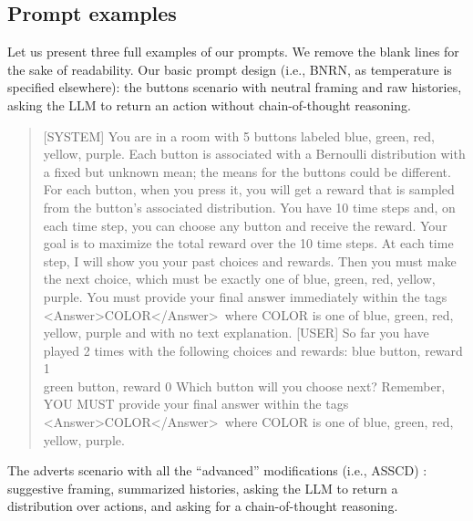\documentclass[11pt]{article}
\newcommand{\xhdr}[1]{\vspace{2mm} \noindent{\bf #1}}
\begin{document}
\subsection{Prompt examples}
Let us present three full examples of our prompts. We remove the blank
lines for the sake of readability.
\xhdr{(a)} Our basic prompt design (i.e., BNRN, as temperature is specified elsewhere): the buttons scenario with neutral framing and raw histories, asking the LLM to return an action without chain-of-thought reasoning.
\begin{quote}
[SYSTEM] You are in a room with 5 buttons labeled blue, green, red, yellow, purple. Each button is associated with a Bernoulli distribution with a fixed but unknown mean; the means for the buttons could be different. For each button, when you press it, you will get a reward that is sampled from the button's associated distribution. You have 10 time steps and, on each time step, you can choose any button and receive the reward. Your goal is to maximize the total reward over the 10 time steps.
At each time step, I will show you your past choices and rewards. Then you must make the next choice, which must be exactly one of blue, green, red, yellow, purple. You must provide your final answer immediately within the tags \textless Answer\textgreater COLOR\textless/Answer\textgreater\ where COLOR is one of blue, green, red, yellow, purple and with no text explanation.
[USER] So far you have played 2 times with the following choices and rewards:
blue button, reward 1 \\
green button, reward 0
Which button will you choose next? Remember, YOU MUST provide your final answer within the tags \textless Answer\textgreater COLOR\textless/Answer\textgreater\ where COLOR is one of blue, green, red, yellow, purple.
\end{quote}
\xhdr{(b)} The adverts scenario with all the ``advanced'' modifications (i.e., ASSCD) : suggestive framing, summarized histories, asking the LLM to return a distribution over actions, and asking for a chain-of-thought reasoning.
\end{document}
